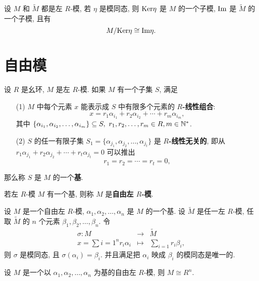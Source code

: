 \begin{theorem}[模同态基本定理]
	设 $M$ 和 $\widetilde{M}$ 都是左 $R$-模, 若 $\eta$ 是模同态, 则 $\text {Ker}\eta$ 是 $M$ 的一个子模, $\text {Im}$ 是 $\widetilde{M}$ 的一个子模, 且有 $$M/\text {Ker}\eta\cong\text {Im}\eta.$$
\end{theorem}

\section{自由模}

\begin{definition}\label{自由模的基}
	设 $R$ 是幺环, $M$ 是左 $R$-模. 如果 $M$ 有一个子集 $S$, 满足
	\begin{itemize}
		\item[(1)] $M$ 中每个元素 $x$ 能表示成 $S$ 中有限多个元素的 \textbf{$R$-线性组合}: $$x=r_1\alpha_{i_1}+r_2\alpha_{i_2}+\cdots+r_m\alpha_{i_m},$$ 其中 $\{\alpha_{i_1},\alpha_{i_2},\ldots,\alpha_{i_m}\}\subseteq S,\ r_1,r_2,\ldots,r_m\in R,m\in \mathbb N^*$.
		\item[(2)] $S$ 的任一有限子集 $S_1=\{\alpha_{j_1},\alpha_{j_2},\ldots,\alpha_{j_t}\}$ 是 \textbf{$R$-线性无关的}, 即从 $r_1\alpha_{j_1}+r_2\alpha_{j_2}+\cdots+r_t\alpha_{j_t}=0$ 可以推出 $$r_1=r_2=\cdots=r_t=0,$$
	\end{itemize}
	那么称 $S$ 是 $M$ 的一个\textbf{基}.
\end{definition}

\begin{definition}\label{自由模}
	若左 $R$-模 $M$ 有一个基, 则称 $M$ 是\textbf{自由左 $R$-模}.
\end{definition}

\begin{theorem}
	设 $M$ 是一个自由左 $R$-模, $\alpha_1,\alpha_2,\ldots,\alpha_n$ 是 $M$ 的一个基. 设 $\widetilde{M}$ 是任一左 $R$-模, 任取 $\widetilde{M}$ 的 $n$ 个元素 $\beta_1,\beta_2,\ldots,\beta_n$. 令 $$\begin{array}{rcl}
	\sigma:M& \to & \widetilde{M}\\
	x=\sum\limits{i=1}^n r_i\alpha_i & \mapsto & \sum\limits_{i=1}r_i\beta_i,
	\end{array}$$ 则 $\sigma$ 是模同态, 且 $\sigma(\alpha_i)=\beta_i$. 并且满足把 $\alpha_i$ 映成 $\beta_i$ 的模同态是唯一的.
\end{theorem}

\begin{theorem}
	设 $M$ 是一个以 $\alpha_1,\alpha_2,\ldots,\alpha_n$ 为基的自由左 $R$-模, 则 $M\cong R^n$.
\end{theorem}

